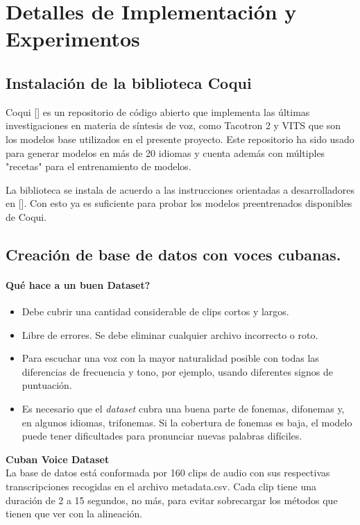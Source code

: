 \chapter{Detalles de Implementación y Experimentos}\label{chapter:implementation}

\section{Instalación de la biblioteca Coqui}
Coqui [\cite{coqui-doc}] es un repositorio de código abierto que implementa las últimas investigaciones en materia de síntesis de voz, como Tacotron 2 y VITS que son los modelos base utilizados en el presente proyecto. Este repositorio ha sido usado para generar modelos en más de 20 idiomas  y cuenta además con múltiples "recetas" para el entrenamiento de modelos. 

La biblioteca se instala de acuerdo a las instrucciones orientadas a desarrolladores en [\cite{coqui-doc}].
Con esto ya es suficiente para probar los modelos preentrenados disponibles de Coqui.


\section{Creación de base de datos con voces cubanas.}

\subsubsection{Qué hace a un buen Dataset?}

\begin{itemize}
	\item Debe cubrir una cantidad considerable de clips cortos y largos.
	\item Libre de errores. Se debe eliminar cualquier archivo incorrecto o roto. 
	\item Para escuchar una voz con la mayor naturalidad posible con todas las diferencias de frecuencia y tono, por ejemplo, usando diferentes signos de puntuación.
	\item Es necesario que el \textit{dataset} cubra una buena parte de fonemas, difonemas y, en algunos idiomas, trifonemas. Si la cobertura de fonemas es baja, el modelo puede tener dificultades para pronunciar nuevas palabras difíciles.
	
\end{itemize}

\textbf{Cuban Voice Dataset}\\
La base de datos está conformada por 160 clips de audio con sus respectivas transcripciones recogidas en el archivo metadata.csv. Cada clip tiene una duración de 2 a 15 segundos, no más, para evitar sobrecargar los métodos que tienen que ver con la alineación.\\

